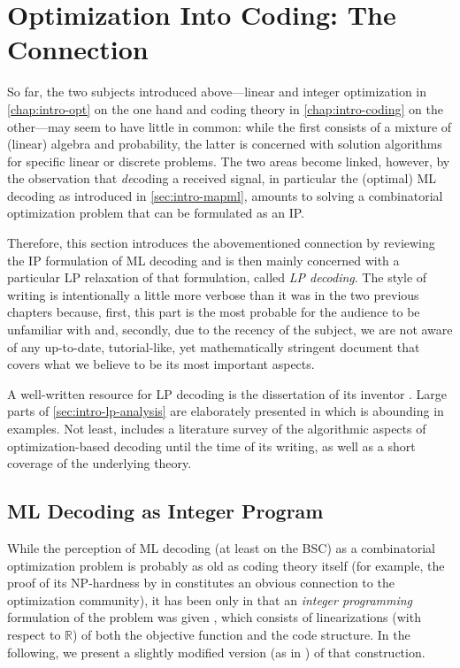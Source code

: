 
\chapter{Optimization Into Coding: The Connection}
\label{chap:intro-optcoding}
So far, the two subjects introduced above—linear and integer optimization in \cref{chap:intro-opt} on the one hand and coding theory in \cref{chap:intro-coding} on the other—may seem to have little in common: while the first consists of a mixture of (linear) algebra and probability, the latter is concerned with solution algorithms for specific linear or discrete problems. The two areas become linked, however, by the observation that \emph{de}coding a received signal, in particular the (optimal) ML decoding as introduced in \cref{sec:intro-mapml}, amounts to solving a combinatorial optimization problem that can be formulated as an IP.

Therefore, this section introduces the abovementioned connection by reviewing the IP formulation of ML decoding and is then mainly concerned with a particular LP relaxation of that formulation, called \emph{LP decoding}. The style of writing is intentionally a little more verbose than it was in the two previous chapters because, first, this part is the most probable for the audience to be unfamiliar with and, secondly, due to the recency of the subject, we are not aware of any up-to-date, tutorial-like, yet mathematically stringent document that covers what we believe to be its most important aspects.

A well-written resource for LP decoding is the dissertation of its inventor \citeauthor*{Feldman03PhD} \cite{Feldman03PhD}. Large parts of \cref{sec:intro-lp-analysis} are elaborately presented in \cite{VontobelKoetter05GraphCover} which is abounding in examples. Not least, \cite{Helmling+11MathProgDecoding} includes a literature survey of the algorithmic aspects of optimization-based decoding until the time of its writing, as well as a short coverage of the underlying theory.

\section{ML Decoding as Integer Program}
\label{sec:intro-ml-ip}
While the perception of ML decoding (at least on the BSC) as a combinatorial optimization problem is probably as old as coding theory itself (for example, the proof of its \textsf{NP}-hardness by \citeauthor{Berlekamp+78IntractabilityCoding} in \citeyear{Berlekamp+78IntractabilityCoding} \cite{Berlekamp+78IntractabilityCoding} constitutes an obvious connection to the optimization community), it has been only in \citeyear{Breitbach+98SoftDecodingOpt} that an \emph{integer programming} formulation of the problem was given \cite{Breitbach+98SoftDecodingOpt}, which consists of linearizations (with respect to $ℝ$) of both the objective function and the code structure. In the following, we present a slightly modified version (as in \cite{Tanatmis+10SeparationAlgorithm}) of that construction.

